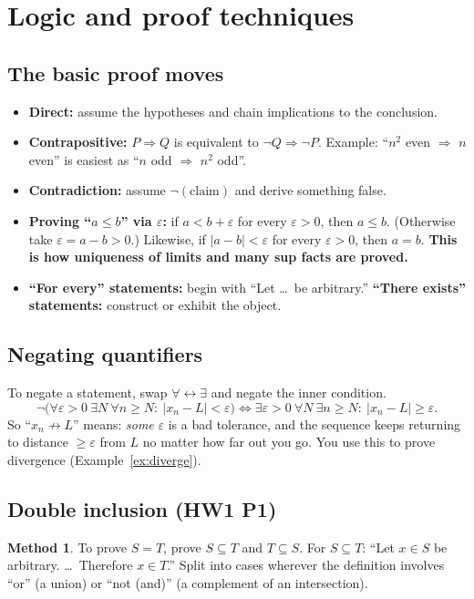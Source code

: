 \documentclass[11pt]{article}
\theoremstyle{definition}
\newtheorem{method}[defn]{Method}
\newcommand{\eps}{\varepsilon}
\newcommand{\key}[1]{\textcolor{red!70!black}{\textbf{#1}}}
\begin{document}
\section{Logic and proof techniques}

\subsection{The basic proof moves}
\begin{itemize}[nosep]
  \item \textbf{Direct:} assume the hypotheses and chain implications to
        the conclusion.
  \item \textbf{Contrapositive:} $P\Rightarrow Q$ is equivalent to
        $\neg Q\Rightarrow\neg P$. Example: ``$n^2$ even $\Rightarrow$ $n$ even''
        is easiest as ``$n$ odd $\Rightarrow$ $n^2$ odd''.
  \item \textbf{Contradiction:} assume $\neg(\text{claim})$ and derive
        something false.
  \item \textbf{Proving ``$a\le b$'' via $\eps$:} if $a<b+\eps$ for every
        $\eps>0$, then $a\le b$. (Otherwise take $\eps=a-b>0$.) Likewise,
        if $|a-b|<\eps$ for every $\eps>0$, then $a=b$. \key{This is how
        uniqueness of limits and many sup facts are proved.}
  \item \textbf{``For every'' statements:} begin with ``Let \ldots\ be
        arbitrary.'' \textbf{``There exists'' statements:} construct or
        exhibit the object.
\end{itemize}

\subsection{Negating quantifiers}
To negate a statement, swap $\forall\leftrightarrow\exists$ and negate the
inner condition.
\[
\neg\bigl(\forall \eps>0\ \exists N\ \forall n\ge N:\ |x_n-L|<\eps\bigr)
\iff
\exists \eps>0\ \forall N\ \exists n\ge N:\ |x_n-L|\ge\eps .
\]
So ``$x_n\not\to L$'' means: \emph{some} $\eps$ is a bad tolerance, and
the sequence keeps returning to distance $\ge\eps$ from $L$ no matter how
far out you go. You use this to prove divergence (Example~\ref{ex:diverge}).

\subsection{Double inclusion (HW1 P1)}
\begin{method}
To prove $S=T$, prove $S\subseteq T$ and $T\subseteq S$. For
$S\subseteq T$: ``Let $x\in S$ be arbitrary. \ldots\ Therefore $x\in T$.''
Split into cases wherever the definition involves ``or'' (a union) or
``not (and)'' (a complement of an intersection).
\end{method}
\end{document}
